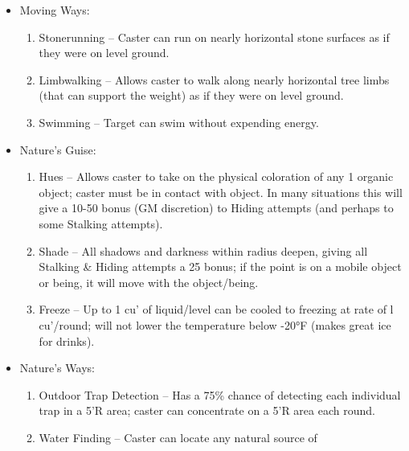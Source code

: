 \documentclass[oneside,12pt]{book}
\begin{document}
\begin{flushleft}
\begin{description}
{\begin{itemize}
\begin{enumerate}
elemental fire/heat attacks. If the target is more than 10’
from the caster at any time, the spell is cancelled.
\item Cold Resistance* – Target is protected from natural
cold down to 20°F (treat as if target were in 70°F
temperature). For temperatures below 20°F, add 50°F
to determine the effective temperature for the target.
Target also receives a +20 to all RRs vs. cold; +20 DB
vs. elemental cold/ice attacks. If the target is more than
10’ from the caster at any time, the spell is cancelled.
\item Resistance I – Caster gets a +5 bonus to their RRs
and DB.
\end{enumerate}
\item Moving Ways:
\begin{enumerate}
\scriptsize
\item Stonerunning – Caster can run on nearly horizontal
stone surfaces as if they were on level ground.
\item Limbwalking – Allows caster to walk along nearly
horizontal tree limbs (that can support the weight)
as if they were on level ground.
\item Swimming – Target can swim without expending energy.
\end{enumerate}
\item Nature's Guise:
\begin{enumerate}
\scriptsize
\item Hues – Allows caster to take on the physical
coloration of any 1 organic object; caster must be in
contact with object. In many situations this will give
a 10-50 bonus (GM discretion) to Hiding attempts
(and perhaps to some Stalking attempts).
\item Shade – All shadows and darkness within radius
deepen, giving all Stalking \& Hiding attempts a 25
bonus; if the point is on a mobile object or being, it
will move with the object/being.
\item Freeze – Up to 1 cu’ of liquid/level can be cooled to
freezing at rate of l cu’/round; will not lower the
temperature below -20°F (makes great ice for drinks).
\end{enumerate}
\item Nature's Ways:
\begin{enumerate}
\scriptsize
\item Outdoor Trap Detection – Has a 75\% chance of
detecting each individual trap in a 5’R area; caster can
concentrate on a 5’R area each round.
\item Water Finding – Caster can locate any natural source of

\end{enumerate}
\end{itemize}}
\end{description}
\end{flushleft}
\end{document}
